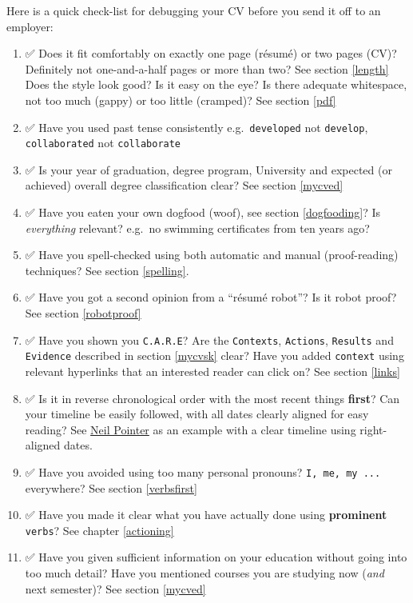 \documentclass[
]{book}
\providecommand{\tightlist}{%
  \setlength{\itemsep}{0pt}\setlength{\parskip}{0pt}}
\begin{document}
Here is a quick check-list for debugging your CV before you send it off to an employer:

\begin{enumerate}
\def\labelenumi{\arabic{enumi}.}
\tightlist
\item
  ✅ Does it fit comfortably on exactly one page (résumé) or two pages (CV)? Definitely not one-and-a-half pages or more than two? See section \ref{length} Does the style look good? Is it easy on the eye? Is there adequate whitespace, not too much (gappy) or too little (cramped)? See section \ref{pdf}
\item
  ✅ Have you used past tense consistently e.g.~\texttt{developed} not \texttt{develop}, \texttt{collaborated} not \texttt{collaborate}
\item
  ✅ Is your year of graduation, degree program, University and expected (or achieved) overall degree classification clear? See section \ref{mycved}
\item
  ✅ Have you eaten your own dogfood (woof), see section \ref{dogfooding}? Is \emph{everything} relevant? e.g.~no swimming certificates from ten years ago?
\item
  ✅ Have you spell-checked using both automatic and manual (proof-reading) techniques? See section \ref{spelling}.
\item
  ✅ Have you got a second opinion from a ``résumé robot''? Is it robot proof? See section \ref{robotproof} 🤖
\item
  ✅ Have you shown you \texttt{C.A.R.E}? Are the \texttt{Contexts}, \texttt{Actions}, \texttt{Results} and \texttt{Evidence} described in section \ref{mycvsk} clear? Have you added \texttt{context} using relevant hyperlinks that an interested reader can click on? See section \ref{links}
\item
  ✅ Is it in reverse chronological order with the most recent things \textbf{first}? Can your timeline be easily followed, with all dates clearly aligned for easy reading? See \href{https://www.cdyf.me/Neil_Pointer.pdf}{Neil Pointer} as an example with a clear timeline using right-aligned dates.
\item
  ✅ Have you avoided using too many personal pronouns? \texttt{I,\ me,\ my\ ...} everywhere? See section \ref{verbsfirst}
\item
  ✅ Have you made it clear what you have actually done using \textbf{prominent} \texttt{verbs}? See chapter \ref{actioning}
\item
  ✅ Have you given sufficient information on your education without going into too much detail? Have you mentioned courses you are studying now (\emph{and} next semester)? See section \ref{mycved}

\end{enumerate}
\end{document}

